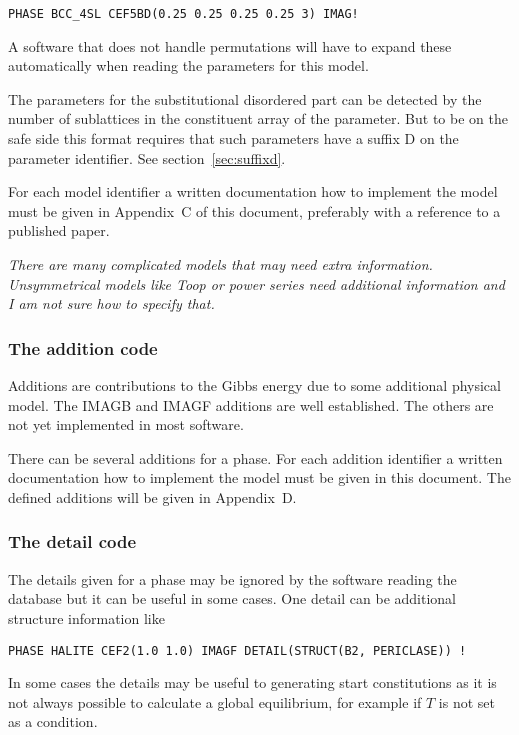 \documentclass[12pt]{article}
\begin{document}
\begin{verbatim}
PHASE BCC_4SL CEF5BD(0.25 0.25 0.25 0.25 3) IMAG!
\end{verbatim}

A software that does not handle permutations will have to expand these
automatically when reading the parameters for this model.

The parameters for the substitutional disordered part can be detected
by the number of sublattices in the constituent array of the
parameter.  But to be on the safe side this format requires that such
parameters have a suffix D on the parameter identifier.  See
section~\ref{sec:suffixd}.

For each model identifier a written documentation how to implement the
model must be given in Appendix~C of this document, preferably with a
reference to a published paper.

{\em There are many complicated models that may need extra
  information.  Unsymmetrical models like Toop or power series need
  additional information and I am not sure how to specify that.}


\subsubsection{The addition code}

Additions are contributions to the Gibbs energy due to some additional
physical model.  The IMAGB and IMAGF additions are well established.
The others are not yet implemented in most software.

There can be several additions for a phase.  For each addition
identifier a written documentation how to implement the model must be
given in this document.  The defined additions will be given in
Appendix~D.

\subsubsection{The detail code}\label{sec:detail}

The details given for a phase may be ignored by the software
reading the database but it can be useful in some cases.  One
detail can be additional structure information like

\begin{verbatim}
PHASE HALITE CEF2(1.0 1.0) IMAGF DETAIL(STRUCT(B2, PERICLASE)) !
\end{verbatim}

In some cases the details may be useful to generating start
constitutions as it is not always possible to calculate a global
equilibrium, for example if $T$ is not set as a condition.
\end{document}
